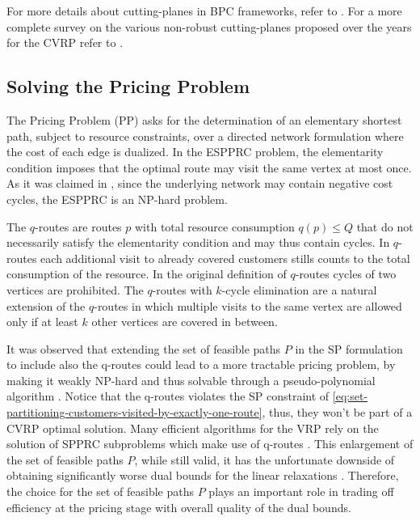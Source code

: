 For more details about cutting-planes in BPC frameworks,
refer to \textcite{desaulniers2011}.
For a more complete survey on the various non-robust cutting-planes
proposed over the years for the CVRP refer to \textcite{costa2019}.


\subsection{Solving the Pricing Problem}
\label{sec:intro-solving-the-pricing-problem}

The Pricing Problem (PP) asks for the determination of an elementary shortest path,
subject to resource constraints,
over a directed network formulation where the cost of each edge
is dualized.
In the ESPPRC problem, the elementarity condition imposes
that the optimal route may visit the same vertex at most once.
As it was claimed in \textcite{dror1994},
since the underlying network may contain negative cost cycles,
the ESPPRC is an NP-hard problem.

\medskip

The $q$-routes \parencite{christofides1981}
are routes $p$ with total resource consumption $q(p) \le Q$
that do not necessarily satisfy the elementarity condition and may thus contain cycles.
In $q$-routes each additional visit to already covered customers
stills counts to the total consumption of the resource.
In the original definition of $q$-routes cycles of two vertices are prohibited.
The $q$-routes with $k$-cycle elimination
are a natural extension of the $q$-routes
in which multiple visits to the same vertex are allowed only
if at least $k$ other vertices are covered in between.


It was observed that extending the set of feasible paths $P$ in
the SP formulation to include also the q-routes could lead to a
more tractable pricing problem, by making it weakly NP-hard
and thus solvable through a pseudo-polynomial algorithm \parencite{desrochers1988, irnich2005}.
Notice that the q-routes violates the SP constraint of \cref{eq:set-partitioning-customers-visited-by-exactly-one-route},
thus, they won't be part of a CVRP optimal solution.
Many efficient algorithms for the VRP
rely on the solution of SPPRC subproblems which
make use of q-routes  \parencite{desrochers1992, feillet2004, fukasawa2006,contardo2011}.
This enlargement of the set of feasible paths $P$,
while still valid,
it has the unfortunate downside
of obtaining significantly worse dual bounds for the linear relaxations \parencite{feillet2004}.
Therefore, the choice for the set of feasible paths $P$ plays an important
role in trading off efficiency at the pricing stage with
overall quality of the dual bounds.


